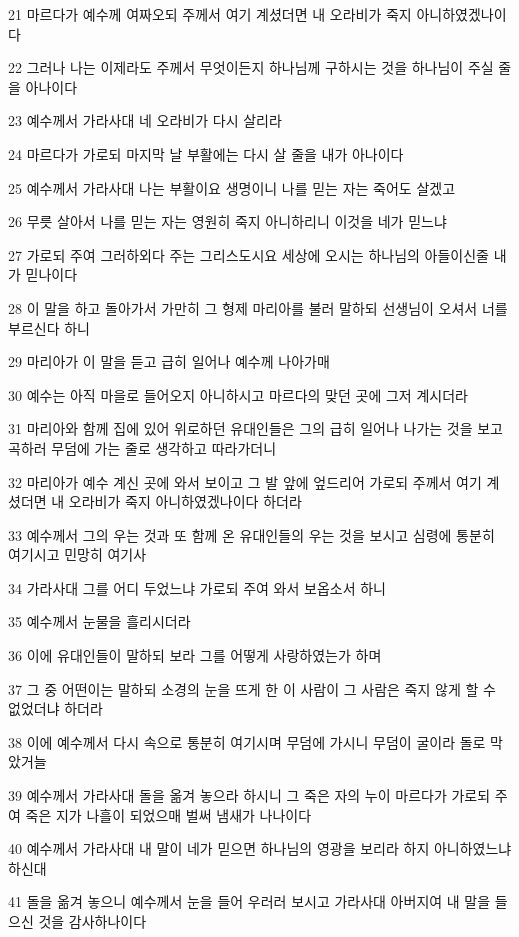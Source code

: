 \par 21 마르다가 예수께 여짜오되 주께서 여기 계셨더면 내 오라비가 죽지 아니하였겠나이다
\par 22 그러나 나는 이제라도 주께서 무엇이든지 하나님께 구하시는 것을 하나님이 주실 줄을 아나이다
\par 23 예수께서 가라사대 네 오라비가 다시 살리라
\par 24 마르다가 가로되 마지막 날 부활에는 다시 살 줄을 내가 아나이다
\par 25 예수께서 가라사대 나는 부활이요 생명이니 나를 믿는 자는 죽어도 살겠고
\par 26 무릇 살아서 나를 믿는 자는 영원히 죽지 아니하리니 이것을 네가 믿느냐
\par 27 가로되 주여 그러하외다 주는 그리스도시요 세상에 오시는 하나님의 아들이신줄 내가 믿나이다
\par 28 이 말을 하고 돌아가서 가만히 그 형제 마리아를 불러 말하되 선생님이 오셔서 너를 부르신다 하니
\par 29 마리아가 이 말을 듣고 급히 일어나 예수께 나아가매
\par 30 예수는 아직 마을로 들어오지 아니하시고 마르다의 맞던 곳에 그저 계시더라
\par 31 마리아와 함께 집에 있어 위로하던 유대인들은 그의 급히 일어나 나가는 것을 보고 곡하러 무덤에 가는 줄로 생각하고 따라가더니
\par 32 마리아가 예수 계신 곳에 와서 보이고 그 발 앞에 엎드리어 가로되 주께서 여기 계셨더면 내 오라비가 죽지 아니하였겠나이다 하더라
\par 33 예수께서 그의 우는 것과 또 함께 온 유대인들의 우는 것을 보시고 심령에 통분히 여기시고 민망히 여기사
\par 34 가라사대 그를 어디 두었느냐 가로되 주여 와서 보옵소서 하니
\par 35 예수께서 눈물을 흘리시더라
\par 36 이에 유대인들이 말하되 보라 그를 어떻게 사랑하였는가 하며
\par 37 그 중 어떤이는 말하되 소경의 눈을 뜨게 한 이 사람이 그 사람은 죽지 않게 할 수 없었더냐 하더라
\par 38 이에 예수께서 다시 속으로 통분히 여기시며 무덤에 가시니 무덤이 굴이라 돌로 막았거늘
\par 39 예수께서 가라사대 돌을 옮겨 놓으라 하시니 그 죽은 자의 누이 마르다가 가로되 주여 죽은 지가 나흘이 되었으매 벌써 냄새가 나나이다
\par 40 예수께서 가라사대 내 말이 네가 믿으면 하나님의 영광을 보리라 하지 아니하였느냐 하신대
\par 41 돌을 옮겨 놓으니 예수께서 눈을 들어 우러러 보시고 가라사대 아버지여 내 말을 들으신 것을 감사하나이다
